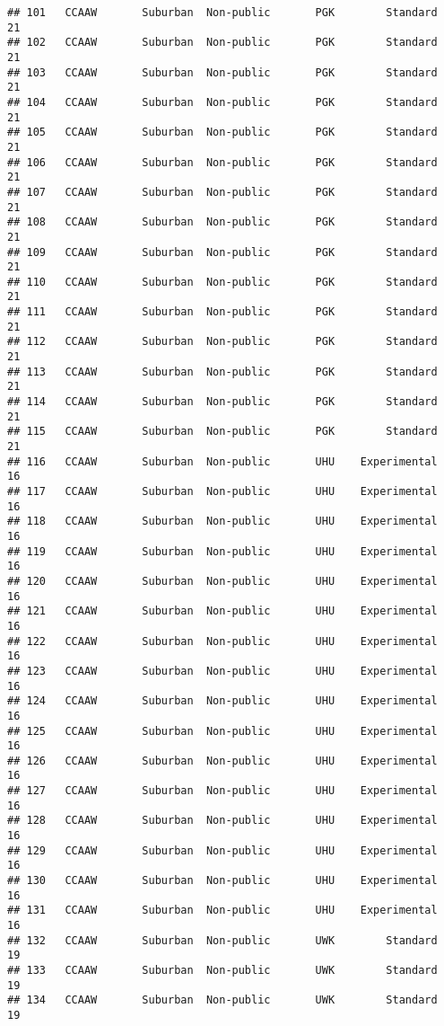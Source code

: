 \documentclass[
]{article}
\begin{document}
\begin{verbatim}
## 101   CCAAW       Suburban  Non-public       PGK        Standard        21
## 102   CCAAW       Suburban  Non-public       PGK        Standard        21
## 103   CCAAW       Suburban  Non-public       PGK        Standard        21
## 104   CCAAW       Suburban  Non-public       PGK        Standard        21
## 105   CCAAW       Suburban  Non-public       PGK        Standard        21
## 106   CCAAW       Suburban  Non-public       PGK        Standard        21
## 107   CCAAW       Suburban  Non-public       PGK        Standard        21
## 108   CCAAW       Suburban  Non-public       PGK        Standard        21
## 109   CCAAW       Suburban  Non-public       PGK        Standard        21
## 110   CCAAW       Suburban  Non-public       PGK        Standard        21
## 111   CCAAW       Suburban  Non-public       PGK        Standard        21
## 112   CCAAW       Suburban  Non-public       PGK        Standard        21
## 113   CCAAW       Suburban  Non-public       PGK        Standard        21
## 114   CCAAW       Suburban  Non-public       PGK        Standard        21
## 115   CCAAW       Suburban  Non-public       PGK        Standard        21
## 116   CCAAW       Suburban  Non-public       UHU    Experimental        16
## 117   CCAAW       Suburban  Non-public       UHU    Experimental        16
## 118   CCAAW       Suburban  Non-public       UHU    Experimental        16
## 119   CCAAW       Suburban  Non-public       UHU    Experimental        16
## 120   CCAAW       Suburban  Non-public       UHU    Experimental        16
## 121   CCAAW       Suburban  Non-public       UHU    Experimental        16
## 122   CCAAW       Suburban  Non-public       UHU    Experimental        16
## 123   CCAAW       Suburban  Non-public       UHU    Experimental        16
## 124   CCAAW       Suburban  Non-public       UHU    Experimental        16
## 125   CCAAW       Suburban  Non-public       UHU    Experimental        16
## 126   CCAAW       Suburban  Non-public       UHU    Experimental        16
## 127   CCAAW       Suburban  Non-public       UHU    Experimental        16
## 128   CCAAW       Suburban  Non-public       UHU    Experimental        16
## 129   CCAAW       Suburban  Non-public       UHU    Experimental        16
## 130   CCAAW       Suburban  Non-public       UHU    Experimental        16
## 131   CCAAW       Suburban  Non-public       UHU    Experimental        16
## 132   CCAAW       Suburban  Non-public       UWK        Standard        19
## 133   CCAAW       Suburban  Non-public       UWK        Standard        19
## 134   CCAAW       Suburban  Non-public       UWK        Standard        19

\end{verbatim}
\end{document}
